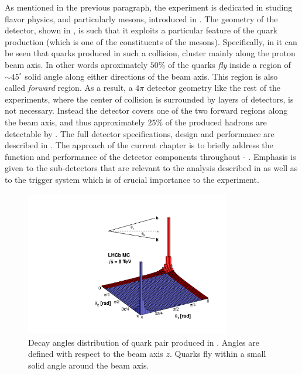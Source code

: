 As mentioned in the previous paragraph, the \lhcb experiment is dedicated in studing flavor physics, 
and particularly \B mesons, introduced in . The geometry of the \lhcb detector, 
shown in , is such that it exploits a particular feature of the 
\bquark quark production (which is one of the constituents of the \B mesons). Specifically, in  
it can be seen that \bquark quarks produced in such a collision, cluster mainly along the proton beam axis. 
In other words aproximately $50\%$ of the \bquark quarks {\it fly} inside a region of $\sim 45^\circ$ solid 
angle along either directions of the beam axis. This region is also called {\it forward} region. 
As a result, a $4\pi$ detector geometry like the rest of the \lhc experiments, where the center of collision 
is surrounded by layers of detectors, is not necessary. Instead the \lhcb detector covers one of the two 
forward regions along the beam axis, and thus approximately $25\%$ of the produced \bquark hadrons are 
detectable by \lhcb. The full \lhcb detector specifications, design and performance are described in \cite{Aaij:2014jba}.
The approach of the current chapter is to briefly address the function and performance of the detector components
throughout  - . Emphasis is given to the sub-detectors that are relevant
to the analysis described in  as well as to the trigger system which is of crucial importance
to the \lhcb experiment.

\begin{figure}[t]
  \centering
  \includegraphics[width=0.8\textwidth, trim=0cm 0cm 0cm 2.5cm, clip=true]{Figures/Chapter2/08_rad_acc_scheme_right}
  \caption{Decay angles distribution of \bquark quark pair produced in \lhcb. Angles are defined with
           respect to the beam axis $z$. Quarks fly within a small solid angle around the beam axis.}
  \label{bb_roduction_angles}
\end{figure}

